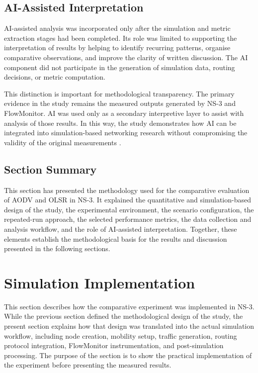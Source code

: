 \documentclass{Academic}
\begin{document}
\subsection{AI-Assisted Interpretation}

AI-assisted analysis was incorporated only after the simulation and metric extraction stages had been completed. Its role was limited to supporting the interpretation of results by helping to identify recurring patterns, organise comparative observations, and improve the clarity of written discussion. The AI component did not participate in the generation of simulation data, routing decisions, or metric computation.

This distinction is important for methodological transparency. The primary evidence in the study remains the measured outputs generated by NS-3 and FlowMonitor. AI was used only as a secondary interpretive layer to assist with analysis of those results. In this way, the study demonstrates how AI can be integrated into simulation-based networking research without compromising the validity of the original measurements \parencite{bhatia2022,duong2024,schuler2021}.

\subsection{Section Summary}

This section has presented the methodology used for the comparative evaluation of AODV and OLSR in NS-3. It explained the quantitative and simulation-based design of the study, the experimental environment, the scenario configuration, the repeated-run approach, the selected performance metrics, the data collection and analysis workflow, and the role of AI-assisted interpretation. Together, these elements establish the methodological basis for the results and discussion presented in the following sections.

\section{Simulation Implementation}

This section describes how the comparative experiment was implemented in NS-3. While the previous section defined the methodological design of the study, the present section explains how that design was translated into the actual simulation workflow, including node creation, mobility setup, traffic generation, routing protocol integration, FlowMonitor instrumentation, and post-simulation processing. The purpose of the section is to show the practical implementation of the experiment before presenting the measured results.
\end{document}
